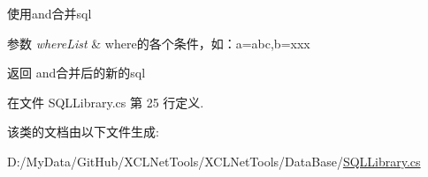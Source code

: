 使用\textquotesingle{}and\textquotesingle{}合并sql 


\begin{DoxyParams}{参数}
{\em where\+List} & where的各个条件，如：a=\textquotesingle{}abc\textquotesingle{},b=\textquotesingle{}xxx\textquotesingle{}\\
\hline
\end{DoxyParams}
\begin{DoxyReturn}{返回}
and合并后的新的sql
\end{DoxyReturn}


在文件 S\+Q\+L\+Library.\+cs 第 25 行定义.



该类的文档由以下文件生成\+:\begin{DoxyCompactItemize}
\item 
D\+:/\+My\+Data/\+Git\+Hub/\+X\+C\+L\+Net\+Tools/\+X\+C\+L\+Net\+Tools/\+Data\+Base/\hyperlink{_s_q_l_library_8cs}{S\+Q\+L\+Library.\+cs}\end{DoxyCompactItemize}
